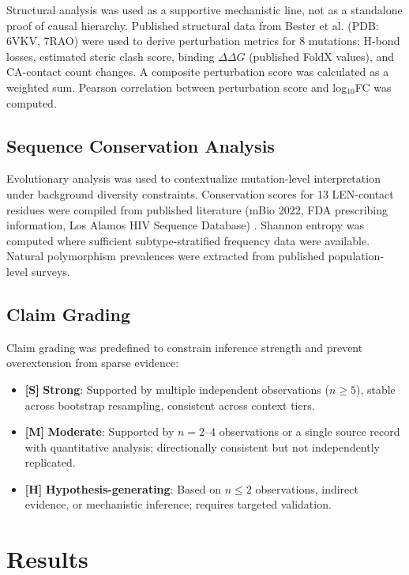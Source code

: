 \documentclass[preprint,authoryear]{elsarticle}
\newcommand{\claimlabel}[1]{\textbf{[#1]}}
\begin{document}
Structural analysis was used as a supportive mechanistic line, not as a standalone proof of causal hierarchy. Published structural data from Bester et al. \cite{Bester2022} (PDB: 6VKV, 7RAO) were used to derive perturbation metrics for 8 mutations: H-bond losses, estimated steric clash score, binding $\Delta\Delta G$ (published FoldX values), and CA-contact count changes. A composite perturbation score was calculated as a weighted sum. Pearson correlation between perturbation score and log$_{10}$FC was computed.

\subsection{Sequence Conservation Analysis}

Evolutionary analysis was used to contextualize mutation-level interpretation under background diversity constraints. Conservation scores for 13 LEN-contact residues were compiled from published literature (mBio 2022, FDA prescribing information, Los Alamos HIV Sequence Database) \cite{Bester2022,FDA2025,LANL2025}. Shannon entropy was computed where sufficient subtype-stratified frequency data were available. Natural polymorphism prevalences were extracted from published population-level surveys.

\subsection{Claim Grading}

Claim grading was predefined to constrain inference strength and prevent overextension from sparse evidence:
\begin{itemize}
  \item \claimlabel{S} \textbf{Strong}: Supported by multiple independent observations ($n \geq 5$), stable across bootstrap resampling, consistent across context tiers.
  \item \claimlabel{M} \textbf{Moderate}: Supported by $n=2$--4 observations or a single source record with quantitative analysis; directionally consistent but not independently replicated.
  \item \claimlabel{H} \textbf{Hypothesis-generating}: Based on $n \leq 2$ observations, indirect evidence, or mechanistic inference; requires targeted validation.
\end{itemize}

\section{Results}
\end{document}
